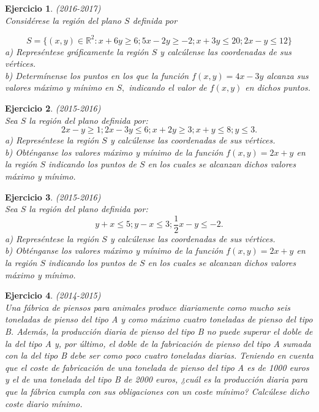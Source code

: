 \documentclass[12pt, a4paper]{amsart}
\newtheorem{ejer}{Ejercicio}
\begin{document}
\begin{ejer}\em (2016-2017)\\
Considérese la región del plano $S$ definida por

\[
S=\{(x,y)\in \mathbb{R}^2: x+6y\geq 6; 5x-2y\geq -2; x+3y\leq 20; 2x-y\leq 12\}
\]
a) Represéntese gráficamente la región $S$ y calcúlense las coordenadas de sus vértices.\\
b) Determínense los puntos en los que la función $f (x, y) = 4x - 3y$ alcanza sus valores máximo y mínimo en $S,$ indicando el valor de $f (x, y)$ en dichos puntos.
\end{ejer}


\begin{ejer}\em (2015-2016)\\
Sea $S$ la región del plano definida por:
\[
2x-y\geq 1; 2x-3y\leq 6; x+2y \geq 3; x+y\leq 8; y\leq 3.
\]
a) Represéntese la región $S$ y calcúlense las coordenadas de sus vértices.\\
b) Obténganse los valores máximo y mínimo de la función $f (x, y ) = 2x + y$ en la región $S$ indicando los puntos de $S$ en los cuales se alcanzan dichos valores máximo y mínimo.
\end{ejer}

\begin{ejer}\em (2015-2016)\\
Sea $S$ la región del plano definida por:
\[
y+x\leq 5; y-x\leq 3; \frac{1}{2}x-y\leq -2.
\]
a) Represéntese la región $S$ y calcúlense las coordenadas de sus vértices.\\
b) Obténganse los valores máximo y mínimo de la función $f (x, y ) = 2x + y$ en la región $S$ indicando los puntos de $S$ en los cuales se alcanzan dichos valores máximo y mínimo.
\end{ejer}

\newpage

\begin{ejer}\em (2014-2015)\\
Una fábrica de piensos para animales produce diariamente como mucho seis toneladas de pienso del tipo A y como máximo cuatro toneladas de pienso del tipo B. Además, la producción diaria de pienso del tipo B no puede superar el doble de la del tipo A y, por último, el doble de la fabricación de pienso del tipo A sumada con la del tipo B debe ser como poco cuatro toneladas diarias. Teniendo en cuenta que el coste de fabricación de una tonelada de pienso del tipo A es de 1000 euros y el de una tonelada del tipo B de 2000 euros, ¿cuál es la producción diaria para que la fábrica cumpla con sus obligaciones con un coste mínimo? Calcúlese dicho coste diario mínimo.
\end{ejer}
\end{document}
